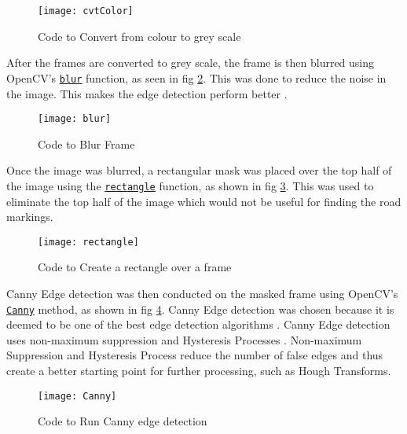 \documentclass[conference]{IEEEtran}
\begin{document}
\begin{figure}[H]
\centerline{\texttt{[image: cvtColor]}}
\caption{Code to Convert from colour to grey scale}
\label{fig:cvtColor}
\end{figure}

After the frames are converted to grey scale, the frame is then blurred using OpenCV's \href{https://docs.opencv.org/4.x/d4/d86/group__imgproc__filter.html#ga8c45db9afe636703801b0b2e440fce37}{\texttt{blur}} function, as seen in fig \ref{fig:blur}. This was done to reduce the noise in the image. This makes the edge detection perform better \cite{Image_Blurring}.

\begin{figure}[H]
\centerline{\texttt{[image: blur]}}
\caption{Code to Blur Frame}
\label{fig:blur}
\end{figure} 

Once the image was blurred, a rectangular mask was placed over the top half of the image using the \href{https://docs.opencv.org/4.x/d6/d6e/group__imgproc__draw.html#ga07d2f74cadcf8e305e810ce8eed13bc9}{\texttt{rectangle}} function, as shown in fig \ref{fig:rectangle}. This was used to eliminate the top half of the image which would not be useful for finding the road markings. 

\begin{figure}[H]
\centerline{\texttt{[image: rectangle]}}
\caption{Code to Create a rectangle over a frame}
\label{fig:rectangle}
\end{figure}
 
Canny Edge detection was then conducted on the masked frame using OpenCV's \href{https://docs.opencv.org/4.x/dd/d1a/group__imgproc__feature.html#ga04723e007ed888ddf11d9ba04e2232de}{\texttt{Canny}} method, as shown in fig \ref{fig:Canny}. Canny Edge detection was chosen because it is deemed to be one of the best edge detection algorithms \cite{Canny2009CannyED}. Canny Edge detection uses non-maximum suppression \cite{non-maximum_supression} and Hysteresis Processes \cite{Hysteresis_Thresholding}. Non-maximum Suppression and Hysteresis Process reduce the number of false edges and thus create a better starting point for further processing, such as Hough Transforms. 

\begin{figure}[H]
\centerline{\texttt{[image: Canny]}}
\caption{Code to Run Canny edge detection}
\label{fig:Canny}
\end{figure}
\end{document}

